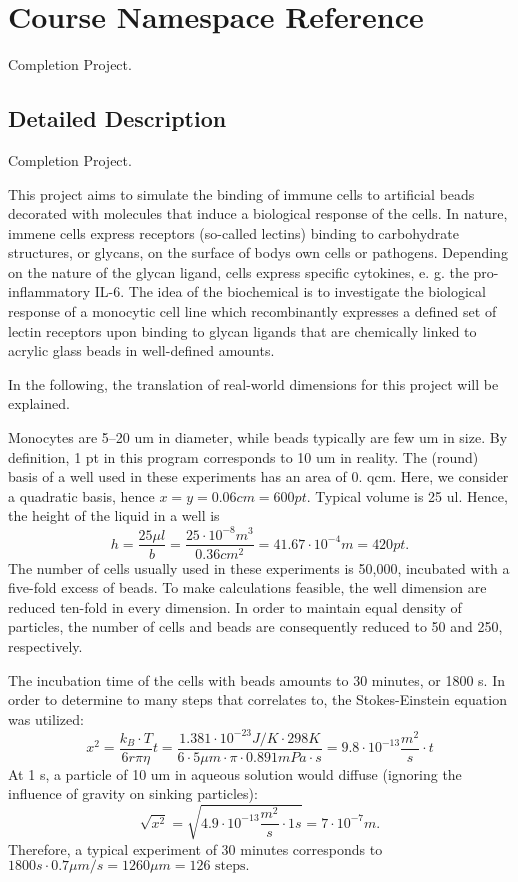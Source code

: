 \hypertarget{namespace_course}{}\section{Course Namespace Reference}
\label{namespace_course}


Completion Project.  




\subsection{Detailed Description}
Completion Project. 

This project aims to simulate the binding of immune cells to artificial beads decorated with molecules that induce a biological response of the cells. In nature, immene cells express receptors (so-\/called lectins) binding to carbohydrate structures, or glycans, on the surface of body\textquotesingle{}s own cells or pathogens. Depending on the nature of the glycan ligand, cells express specific cytokines, e. g. the pro-\/inflammatory I\+L-\/6. The idea of the biochemical is to investigate the biological response of a monocytic cell line which recombinantly expresses a defined set of lectin receptors upon binding to glycan ligands that are chemically linked to acrylic glass beads in well-\/defined amounts.

In the following, the translation of real-\/world dimensions for this project will be explained.

Monocytes are 5--20 um in diameter, while beads typically are few um in size. By definition, 1 pt in this program corresponds to 10 um in reality. The (round) basis of a well used in these experiments has an area of 0. qcm. Here, we consider a quadratic basis, hence $x=y=0.06 cm=600 pt$. Typical volume is 25 ul. Hence, the height of the liquid in a well is \[ h = \frac{25 \mu l}{b} = \frac{25 \cdot 10^{-8} m^3}{0.36 cm^2} = 41.67 \cdot 10^{-4} m = 420 pt. \] The number of cells usually used in these experiments is 50,000, incubated with a five-\/fold excess of beads. To make calculations feasible, the well dimension are reduced ten-\/fold in every dimension. In order to maintain equal density of particles, the number of cells and beads are consequently reduced to 50 and 250, respectively.

The incubation time of the cells with beads amounts to 30 minutes, or 1800 s. In order to determine to many steps that correlates to, the Stokes-\/\+Einstein equation was utilized\+: \[ x^2 = \frac{k_B \cdot T}{6r \pi \eta} t = \frac{1.381 \cdot 10^{-23} J/K \cdot 298 K}{6 \cdot 5 \mu m \cdot \pi \cdot 0.891 mPa \cdot s} = 9.8 \cdot 10^{-13} \frac{m^2}{s} \cdot t \] At 1 s, a particle of 10 um in aqueous solution would diffuse (ignoring the influence of gravity on sinking particles)\+: \[ \sqrt{x^2} = \sqrt{4.9 \cdot 10^{-13} \frac{m^2}{s} \cdot 1s} = 7 \cdot 10^{-7} m.\] Therefore, a typical experiment of 30 minutes corresponds to $ 1800 s \cdot 0.7 \mu m/s = 1260 \mu m = 126\mbox{ steps}. $

